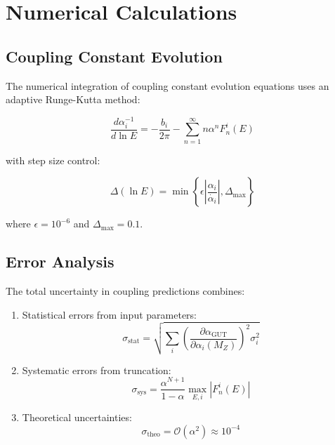 \documentclass[12pt]{article}
\begin{document}
\section{Numerical Calculations}
\label{app:numerical}

\subsection{Coupling Constant Evolution}

The numerical integration of coupling constant evolution equations uses an adaptive Runge-Kutta method:

\begin{equation}
\frac{d\alpha_i^{-1}}{d\ln E} = -\frac{b_i}{2\pi} - \sum_{n=1}^{\infty} n\alpha^n F_n^i(E)
\end{equation}

with step size control:

\begin{equation}
\Delta(\ln E) = \min\left\{\epsilon\left|\frac{\alpha_i}{\dot{\alpha_i}}\right|, \Delta_{\text{max}}\right\}
\end{equation}

where $\epsilon = 10^{-6}$ and $\Delta_{\text{max}} = 0.1$.

\subsection{Error Analysis}

The total uncertainty in coupling predictions combines:

\begin{enumerate}
\item Statistical errors from input parameters:
   \begin{equation}
   \sigma_{\text{stat}} = \sqrt{\sum_i \left(\frac{\partial\alpha_{\text{GUT}}}{\partial\alpha_i(M_Z)}\right)^2 \sigma_i^2}
   \end{equation}

\item Systematic errors from truncation:
   \begin{equation}
   \sigma_{\text{sys}} = \frac{\alpha^{N+1}}{1-\alpha} \max_{E,i} |F_n^i(E)|
   \end{equation}

\item Theoretical uncertainties:
   \begin{equation}
   \sigma_{\text{theo}} = \mathcal{O}(\alpha^2) \approx 10^{-4}
   \end{equation}
\end{enumerate}
\end{document}
